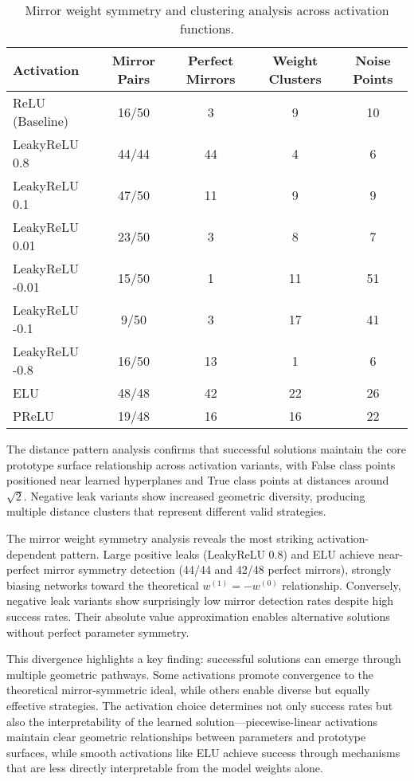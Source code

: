 \begin{table}[ht]
\centering
\caption{Mirror weight symmetry and clustering analysis across activation functions.}
\label{tab:relu1-activation-symmetry}
\begin{tabular}{lcccc}
\toprule
Activation & Mirror Pairs & Perfect Mirrors & Weight Clusters & Noise Points \\
\midrule
ReLU (Baseline) & 16/50 & 3 & 9 & 10 \\
LeakyReLU 0.8 & 44/44 & 44 & 4 & 6 \\
LeakyReLU 0.1 & 47/50 & 11 & 9 & 9 \\
LeakyReLU 0.01 & 23/50 & 3 & 8 & 7 \\
LeakyReLU -0.01 & 15/50 & 1 & 11 & 51 \\
LeakyReLU -0.1 & 9/50 & 3 & 17 & 41 \\
LeakyReLU -0.8 & 16/50 & 13 & 1 & 6 \\
ELU & 48/48 & 42 & 22 & 26 \\
PReLU & 19/48 & 16 & 16 & 22 \\
\bottomrule
\end{tabular}
\end{table}

The distance pattern analysis confirms that successful solutions maintain the core prototype surface relationship across activation variants, with False class points positioned near learned hyperplanes and True class points at distances around $\sqrt{2}$. Negative leak variants show increased geometric diversity, producing multiple distance clusters that represent different valid strategies.

The mirror weight symmetry analysis reveals the most striking activation-dependent pattern. Large positive leaks (LeakyReLU 0.8) and ELU achieve near-perfect mirror symmetry detection (44/44 and 42/48 perfect mirrors), strongly biasing networks toward the theoretical $w^{(1)} = -w^{(0)}$ relationship. Conversely, negative leak variants show surprisingly low mirror detection rates despite high success rates. Their absolute value approximation enables alternative solutions without perfect parameter symmetry.

This divergence highlights a key finding: successful solutions can emerge through multiple geometric pathways. Some activations promote convergence to the theoretical mirror-symmetric ideal, while others enable diverse but equally effective strategies. The activation choice determines not only success rates but also the interpretability of the learned solution—piecewise-linear activations maintain clear geometric relationships between parameters and prototype surfaces, while smooth activations like ELU achieve success through mechanisms that are less directly interpretable from the model weights alone.


